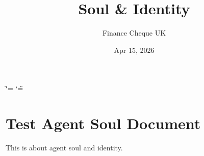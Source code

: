 \documentclass[a4paper,10pt,english]{sphinxmanual}
\title{Soul & Identity}
\date{Apr 15, 2026}
\author{Finance Cheque UK}
\begin{document}
\ifdefined\shorthandoff
  \ifnum\catcode`\=\string=\active\shorthandoff{=}\fi
  \ifnum\catcode`\"=\active{}\fi
\fi

\pagestyle{empty}
\sphinxmaketitle
\pagestyle{plain}
\sphinxtableofcontents
\pagestyle{normal}
\label{\detokenize{index::doc}}


\sphinxstepscope


\chapter{Test Agent Soul Document}
\label{\detokenize{test-soul:test-agent-soul-document}}\label{\detokenize{test-soul::doc}}
\sphinxAtStartPar
This is about agent soul and identity.



\renewcommand{\indexname}{Index}
\printindex
\end{document}
